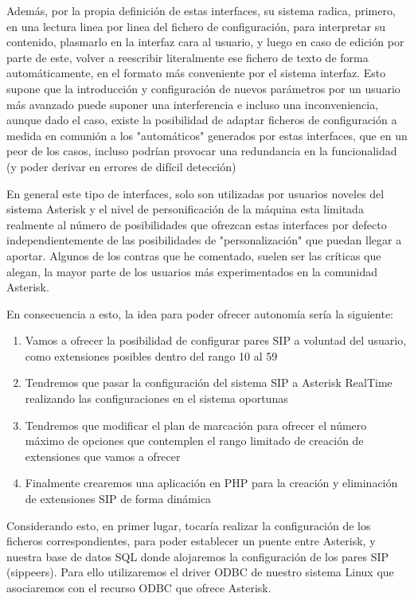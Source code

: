Además, por la propia definición de estas interfaces, su sistema radica, primero, en una lectura linea por linea del fichero de configuración, para interpretar su contenido, plasmarlo en la interfaz cara al usuario, y luego en caso de edición por parte de este, volver a reescribir literalmente ese fichero de texto de forma automáticamente, en el formato más conveniente por el sistema interfaz. Esto supone que la introducción y configuración de nuevos parámetros por un usuario más avanzado puede suponer una interferencia e incluso una inconveniencia, aunque dado el caso, existe la posibilidad de adaptar ficheros de configuración a medida en comunión a los "automáticos" generados por estas interfaces, que en un peor de los casos, incluso podrían provocar una redundancia en la funcionalidad (y poder derivar en errores de difícil detección)

En general este tipo de interfaces, solo son utilizadas por usuarios noveles del sistema Asterisk y el nivel de personificación de la máquina esta limitada realmente al número de posibilidades que ofrezcan estas interfaces por defecto independientemente de las posibilidades de "personalización" que puedan llegar a aportar. Algunos de los contras que he comentado, suelen ser las críticas que alegan, la mayor parte de los usuarios más experimentados en la comunidad Asterisk.

En consecuencia a esto, la idea para poder ofrecer autonomía sería la siguiente:

\begin{enumerate}

\item {Vamos a ofrecer la posibilidad de configurar pares SIP a voluntad del usuario, como extensiones posibles dentro del rango 10 al 59}
\item {Tendremos que pasar la configuración del sistema SIP a Asterisk RealTime realizando las configuraciones en el sistema oportunas}
\item {Tendremos que modificar el plan de marcación para ofrecer el número máximo de opciones que contemplen el rango limitado de creación de extensiones que vamos a ofrecer}
\item {Finalmente crearemos una aplicación en PHP para la creación y eliminación de extensiones SIP de forma dinámica}

\end{enumerate}

Considerando esto, en primer lugar, tocaría realizar la configuración de los ficheros correspondientes, para poder establecer un puente entre Asterisk, y nuestra base de datos SQL donde alojaremos la configuración de los pares SIP (sippeers). Para ello utilizaremos el driver ODBC de nuestro sistema Linux que asociaremos con el recurso ODBC que ofrece Asterisk.

